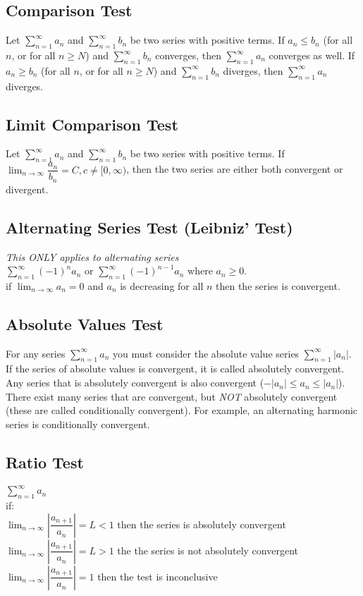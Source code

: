 \documentclass{article}
\begin{document}
\subsection*{Comparison Test}
Let $\displaystyle \sum^\infty_{n=1}a_n$ and $\displaystyle \sum^\infty_{n=1}b_n$ be two series with positive terms. If $a_n\le b_n$ (for all $n$, or for all $n\ge N$) and $\displaystyle \sum^\infty_{n=1}b_n$ converges, then $\displaystyle \sum^\infty_{n=1}a_n$ converges as well. If $a_n\ge b_n$ (for all $n$, or for all $n\ge N$) and $\displaystyle \sum^\infty_{n=1}b_n$ diverges, then $\displaystyle \sum^\infty_{n=1}a_n$ diverges.
\subsection*{Limit Comparison Test}
Let $\displaystyle \sum^\infty_{n=1}a_n$ and $\displaystyle \sum^\infty_{n=1}b_n$ be two series with positive terms. If $\displaystyle \lim_{n\to\infty}\dfrac{a_n}{b_n}=C, c \not= [0,\infty)$, then the two series are either both convergent or divergent.
\subsection*{Alternating Series Test (Leibniz' Test)}
\textit{This ONLY applies to alternating series}\\
$\displaystyle \sum^\infty_{n=1}(-1)^na_n$ or $\displaystyle \sum^\infty_{n=1}(-1)^{n-1}a_n$ where $a_n\ge 0$.\\
if $\displaystyle \lim_{n\to\infty}a_n=0$ and $a_n$ is decreasing for all $n$ then the series is convergent.
\subsection*{Absolute Values Test}
For any series $\displaystyle \sum^\infty_{n=1}a_n$ you must consider the absolute value series $\displaystyle \sum^\infty_{n=1}|a_n|$. If the series of absolute values is convergent, it is called absolutely convergent. Any series that is absolutely convergent is also convergent ($-|a_n|\le a_n \le |a_n|$). There exist many series that are convergent, but \textit{NOT} absolutely convergent (these are called conditionally convergent). For example, an alternating harmonic series is conditionally convergent.
\subsection*{Ratio Test}
$\displaystyle \sum^\infty_{n=1}a_n$\\
if:\\
\indent $\displaystyle \lim_{n\to\infty}|\dfrac{a_{n+1}}{a_n}|=L<1$ then the series is absolutely convergent\\
\indent $\displaystyle \lim_{n\to\infty}|\dfrac{a_{n+1}}{a_n}|=L>1$ the the series is not absolutely convergent\\
\indent $\displaystyle \lim_{n\to\infty}|\dfrac{a_{n+1}}{a_n}|=1$ then the test is inconclusive\\
\end{document}
